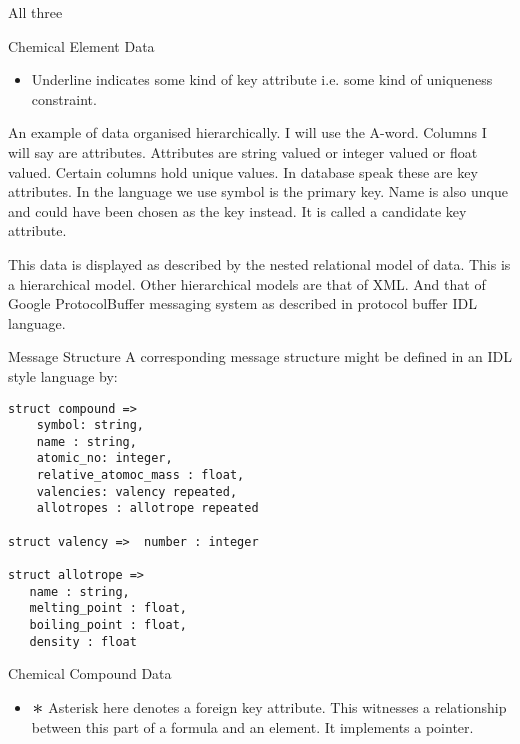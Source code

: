\begin{frame}{All three}
\scalebox{0.75}{

}
\scalebox{0.75}{

}
\scalebox{0.75}{

}
\end{frame}

\begin{frame}{Chemical Element Data}
\scalebox{0.75}{

}

\begin{itemize}
	\item Underline indicates some kind of key attribute i.e. some kind of uniqueness constraint.
\end{itemize}
An example of data organised hierarchically. 
I will use the A-word. Columns I will say are attributes. Attributes are string valued or integer valued or float  valued.
Certain columns hold unique values. In database speak these are key attributes. In the language we use
symbol is the primary key. Name is also unque and could have been chosen as the key instead. It is called a candidate key attribute.


This data is displayed as described by the nested relational model of data. This is a hierarchical model.
Other hierarchical models are that of XML. And that of Google ProtocolBuffer messaging system as described in protocol buffer IDL language.

\end{frame}


\begin{frame}[fragile]{Message Structure}
A corresponding message structure might be defined 
in an IDL style language by:

\begin{lstlisting}[basicstyle=\footnotesize,language=IDL]
struct compound => 
    symbol: string,
    name : string,
    atomic_no: integer,
    relative_atomoc_mass : float,
    valencies: valency repeated,
    allotropes : allotrope repeated

struct valency =>  number : integer 

struct allotrope =>
   name : string,
   melting_point : float,
   boiling_point : float,
   density : float
\end{lstlisting}
\end{frame}


\begin{frame}{Chemical Compound Data}
\scalebox{0.75}{

}
\begin{itemize}
\item $\largeAsterisk$ Asterisk here denotes a foreign key attribute. 
\pause This witnesses a relationship between this part of a formula and an element. \pause It implements a pointer.
\end{itemize}
\end{frame}

